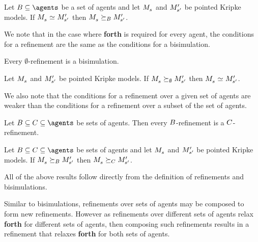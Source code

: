 \begin{corollary}\label{bisimilar-refinement}
Let $\agentsB \subseteq \agents$ be a set of agents and let $\kPModel{\kStateS}$ and ${M^{\prime}_{{s}^{\prime}}}$ be pointed Kripke models.
If $\kPModel{\kStateS} \bisimilar \kPModelP{\kStateSP}$ then $\kPModel{\kStateS} \simulatesBs \kPModelP{\kStateSP}$.
\end{corollary}

We note that in the case where {\bf forth} is required for every agent, the conditions for a refinement are the same as the conditions for a bisimulation.

\begin{proposition}\label{refinement-bisimulation}
Every $\emptyset$-refinement is a bisimulation.
\end{proposition}

\begin{corollary}\label{refinement-bisimilar}
Let $\kPModel{\kStateS}$ and ${M^{\prime}_{{s}^{\prime}}}$ be pointed Kripke models.
If $\kPModel{\kStateS} \simulates[\emptyset] \kPModelP{\kStateSP}$ then $\kPModel{\kStateS} \bisimilar \kPModelP{\kStateSP}$.
\end{corollary}

We also note that the conditions for a refinement over a given set of agents are weaker than the conditions for a refinement over a subset of the set of agents.

\begin{proposition}
Let $\agentsB \subseteq \agentsC \subseteq \agents$ be sets of agents.
Then every $B$-refinement is a $C$-refinement.
\end{proposition}

\begin{corollary}
Let $\agentsB \subseteq \agentsC \subseteq \agents$ be sets of agents and let $\kPModel{\kStateS}$ and ${M^{\prime}_{{s}^{\prime}}}$ be pointed Kripke models.
If $\kPModel{\kStateS} \simulatesBs \kPModelP{\kStateSP}$ then $\kPModel{\kStateS} \simulatesCs \kPModelP{\kStateSP}$.
\end{corollary}

All of the above results follow directly from the definition of refinements and bisimulations.

Similar to bisimulations, refinements over sets of agents may be composed to form new refinements.
However as refinements over different sets of agents relax {\bf forth} for different sets of agents, then composing such refinements results in a refinement that relaxes {\bf forth} for both sets of agents.

